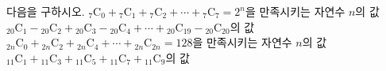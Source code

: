 다음을 구하시오.
 ${}_7\mathrm{C}_0+{}_7\mathrm{C}_1+{}_7\mathrm{C}_2+\cdots+{}_7\mathrm{C}_7=2^n$을 만족시키는 자연수 $n$의 값
 ${}_{20}\mathrm{C}_1-{}_{20}\mathrm{C}_2+{}_{20}\mathrm{C}_3-{}_{20}\mathrm{C}_4+\cdots+{}_{20}\mathrm{C}_{19}-{}_{20}\mathrm{C}_{20}$의 값
 ${}_{2n}\mathrm{C}_0+{}_{2n}\mathrm{C}_2+{}_{2n}\mathrm{C}_4+\cdots+{}_{2n}\mathrm{C}_{2n}=128$을 만족시키는 자연수 $n$의 값
 ${}_{11}\mathrm{C}_1+{}_{11}\mathrm{C}_3+{}_{11}\mathrm{C}_5+{}_{11}\mathrm{C}_7+{}_{11}\mathrm{C}_9$의 값
